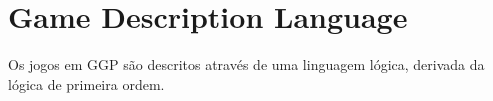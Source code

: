\chapter{Game Description Language}
\label{gdl}

Os jogos em GGP são descritos através de uma linguagem lógica, derivada da lógica de primeira ordem.\textbf{}